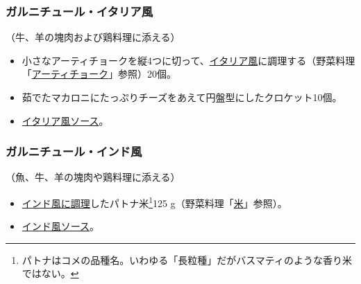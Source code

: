 \begin{recette}
\hypertarget{garniture-a-l-italienne}{%
\subsubsection{ガルニチュール・イタリア風}\label{garniture-a-l-italienne}}



（牛、羊の塊肉および鶏料理に添える）

\begin{itemize}
\item
  小さなアーティチョークを縦4つに切って、\protect\hyperlink{quartiers-d-artichauts-a-l-italienne}{イタリア風}に調理する（野菜料理「\protect\hyperlink{artichauts}{アーティチョーク}」参照）20個。
\item
  茹でたマカロニにたっぷりチーズをあえて円盤型にしたクロケット10個。
\item
  \protect\hyperlink{sauce-italienne}{イタリア風ソース}。
\end{itemize}

\hypertarget{garniture-a-l-indienne}{%
\subsubsection{ガルニチュール・インド風}\label{garniture-a-l-indienne}}



（魚、牛、羊の塊肉や鶏料理に添える）

\begin{itemize}
\item
  \protect\hyperlink{riz-a-l-indienne}{インド風に調理}したパトナ米\footnote{パトナはコメの品種名。いわゆる「長粒種」だがバスマティのような香り米ではない。}125
  g（野菜料理「\protect\hyperlink{riz}{米}」参照）。
\item
  \protect\hyperlink{sauce-a-l-indienne}{インド風ソース}。
\end{itemize}


\end{recette}
